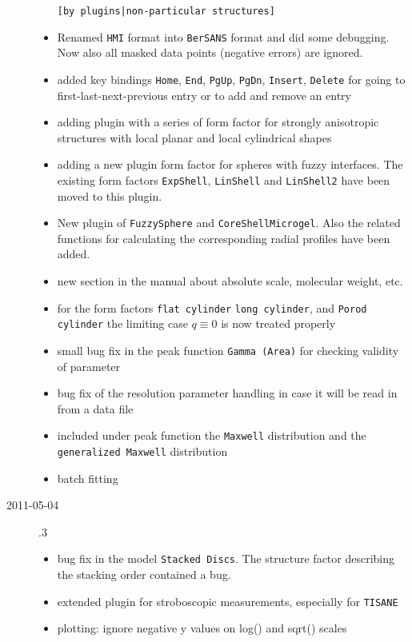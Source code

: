 \begin{description}
\begin{itemize}
            \texttt{[by plugins|non-particular structures]}
      \item Renamed \texttt{HMI} format into \texttt{BerSANS} format and did some debugging.
            Now also all masked data points (negative errors) are ignored.
      \item added key bindings \texttt{Home}, \texttt{End}, \texttt{PgUp}, \texttt{PgDn}, \texttt{Insert},
            \texttt{Delete} for going to first-last-next-previous entry or to add and remove an entry
      \item adding plugin with a series of form factor for strongly anisotropic structures
            with local planar and local cylindrical shapes
      \item adding a new plugin form factor for spheres with fuzzy interfaces. The existing form factors
            \texttt{ExpShell}, \texttt{LinShell} and \texttt{LinShell2} have been moved to this plugin.
      \item New plugin of \texttt{FuzzySphere} and \texttt{CoreShellMicrogel}.
            Also the related functions for calculating the corresponding radial profiles have been added.
      \item new section in the manual about absolute scale, molecular weight, etc.
      \item for the form factors \texttt{flat cylinder} \texttt{long cylinder}, and \texttt{Porod cylinder}
            the limiting case $q \equiv 0$ is now treated properly
      \item small bug fix in the peak function \texttt{Gamma (Area)} for checking
            validity of parameter
      \item bug fix of the resolution parameter handling in case it will be read in from a data file
      \item included under peak function the \texttt{Maxwell} distribution and the
            \texttt{generalized Maxwell} distribution
      \item batch fitting
    \end{itemize}
    \item[2011-05-04] .3
        \begin{itemize}
        \item  bug fix in the model \texttt{Stacked Discs}. The structure factor describing the
            stacking order contained a bug.
        \item extended plugin for stroboscopic measurements, especially for \texttt{TISANE}
        \item plotting: ignore negative y values on log() and sqrt() scales

\end{itemize}
\end{description}
